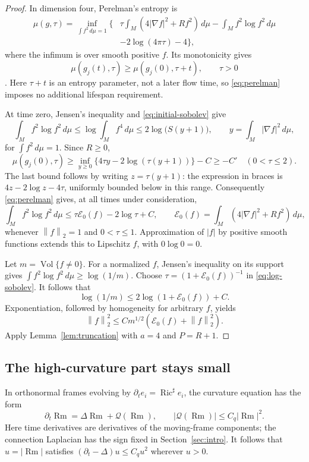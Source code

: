 \documentclass[11pt]{article}
\theoremstyle{definition}
\theoremstyle{remark}
\numberwithin{equation}{section}
\DeclareMathOperator{\Ric}{Ric}
\DeclareMathOperator{\Rm}{Rm}
\DeclareMathOperator{\Vol}{Vol}
\newcommand{\dd}{\,d\mu}
\newcommand{\E}{\mathcal E}
\newcommand{\norm}[1]{\left\lVert #1\right\rVert}
\begin{document}
\begin{proof}
In dimension four, Perelman's entropy is
\begin{align*}
 \mu(g,\tau)=\inf_{\int f^2\dd=1}\bigg\{
 &\tau\int_M(4|\nabla f|^2+Rf^2)\dd
 -\int_Mf^2\log f^2\dd\\
 &-2\log(4\pi\tau)-4\bigg\},
\end{align*}
where the infimum is over smooth positive $f$. Its monotonicity gives
\begin{equation}\label{eq:perelman}
 \mu(g_j(t),\tau)\ge\mu(g_j(0),\tau+t),\qquad \tau>0
\end{equation}
\cite[Section~3]{Perelman}. Here $\tau+t$ is an entropy parameter, not
a later flow time, so \eqref{eq:perelman} imposes no additional lifespan
requirement.

At time zero, Jensen's inequality and \eqref{eq:initial-sobolev} give
\[
 \int_Mf^2\log f^2\dd\le\log\int_Mf^4\dd
 \le2\log\bigl(S(y+1)\bigr),\qquad
 y=\int_M|\nabla f|^2\dd,
\]
for $\int f^2\dd=1$. Since $R\ge0$,
\[
 \mu(g_j(0),\tau)\ge
 \inf_{y\ge0}\{4\tau y-2\log(\tau(y+1))\}-C\ge-C'
 \quad(0<\tau\le2).
\]
The last bound follows by writing $z=\tau(y+1)$: the expression in
braces is $4z-2\log z-4\tau$, uniformly bounded below in this range.
Consequently \eqref{eq:perelman} gives, at all times under consideration,
\begin{equation}\label{eq:log-sobolev}
 \int_Mf^2\log f^2\dd
 \le\tau\E_0(f)-2\log\tau+C,
 \qquad \E_0(f)=\int_M(4|\nabla f|^2+Rf^2)\dd,
\end{equation}
whenever $\norm f_2=1$ and $0<\tau\le1$.
Approximation of $|f|$ by positive smooth functions extends this to
Lipschitz $f$, with $0\log0=0$.

Let $m=\Vol\{f\ne0\}$. For a normalized $f$, Jensen's inequality on
its support gives $\int f^2\log f^2\dd\ge\log(1/m)$.
Choose $\tau=(1+\E_0(f))^{-1}$ in \eqref{eq:log-sobolev}. It follows
that
\[
 \log(1/m)\le2\log(1+\E_0(f))+C.
\]
Exponentiation, followed by homogeneity for arbitrary $f$, yields
\[
 \norm f_2^2\le Cm^{1/2}\left(\E_0(f)+\norm f_2^2\right).
\]
Apply Lemma~\ref{lem:truncation} with $a=4$ and $P=R+1$.
\end{proof}

\subsection{The high-curvature part stays small}

In orthonormal frames evolving by
$\partial_te_i=\Ric^\sharp e_i$, the curvature equation has the form
\begin{equation}\label{eq:curvature-flow}
 \partial_t\Rm=\Delta\Rm+\mathcal Q(\Rm),\qquad
 |\mathcal Q(\Rm)|\le C_q|\Rm|^2.
\end{equation}
Here time derivatives are derivatives of the moving-frame components;
the connection Laplacian has the sign fixed in Section~\ref{sec:intro}.
It follows that $u=|\Rm|$ satisfies
$(\partial_t-\Delta)u\le C_qu^2$ wherever $u>0$.
\end{document}
